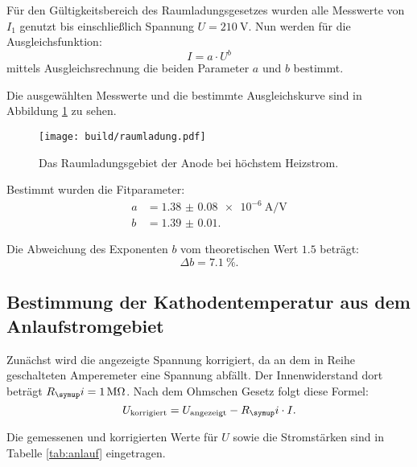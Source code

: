 Für den Gültigkeitsbereich des Raumladungsgesetzes wurden alle Messwerte von $I_1$
genutzt bis einschließlich Spannung $U = \SI{210}{\volt}$.
Nun werden für die Ausgleichsfunktion:
\begin{equation}
  I = a \cdot U^b
\end{equation}
mittels Ausgleichsrechnung die beiden Parameter $a$ und $b$ bestimmt.

Die ausgewählten Messwerte und die bestimmte Ausgleichskurve sind in Abbildung
\ref{fig:raumladung} zu sehen.
\begin{figure}
  \centering
  \texttt{[image: build/raumladung.pdf]}
  \caption{Das Raumladungsgebiet der Anode bei höchstem Heizstrom.}
  \label{fig:raumladung}
\end{figure}

Bestimmt wurden die Fitparameter:
\begin{align*}
  a &= \SI{1.38(8)e-6}{\ampere\per\volt}\\
  b &= \num{1.39(1)}.
\end{align*}

Die Abweichung des Exponenten $b$ vom theoretischen Wert $\num{1.5}$
beträgt:
\begin{equation*}
  \Delta b = \SI{7.1}{\percent}.
\end{equation*}
\FloatBarrier

\subsection{Bestimmung der Kathodentemperatur aus dem Anlaufstromgebiet}

Zunächst wird die angezeigte Spannung korrigiert, da an dem in Reihe geschalteten
Amperemeter eine Spannung abfällt. Der Innenwiderstand dort beträgt $R_\g{i} = \SI{1}{\mega\ohm}$.
Nach dem Ohmschen Gesetz folgt diese Formel:
\begin{equation}
  U_\text{korrigiert} = U_\text{angezeigt} - R_\g{i} \cdot I.
\end{equation}

Die gemessenen und korrigierten Werte für $U$ sowie die Stromstärken sind in Tabelle \ref{tab:anlauf}
eingetragen.

